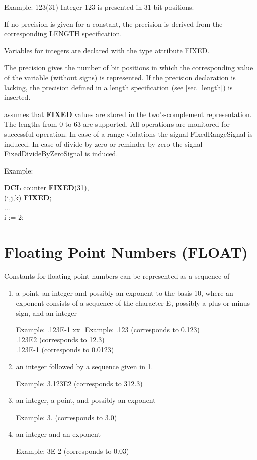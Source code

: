 Example: 123(31) \x Integer 123 is presented in 31 bit positions.

If no precision is given for a constant,
the precision is derived from the %
corresponding LENGTH specification.

Variables for integers are declared with the type attribute FIXED.




The precision gives the number of bit positions in which the
corresponding value of the variable (without signs) is represented. If
the precision declaration is lacking, the precision defined in a length
specification (see \ref{sec_length}) is inserted. 

\OpenPEARL{} assumes that {\bf FIXED} values are stored in the two's-complement
representation.  The lengths from 0 to 63 are supported.
All operations are monitored for successful operation.
In case of a range violations the signal FixedRangeSignal is induced.
In case of divide by zero or reminder by zero the signal FixedDivideByZeroSignal
is induced.

Example:

{\bf DCL} counter {\bf FIXED}(31),\\
\x (i,j,k) {\bf FIXED};\\
...\\
i := 2;

\section{Floating Point Numbers (FLOAT)}  %

Constants for floating point numbers can be represented as a sequence of
\begin{enumerate}
\item a point, an integer and possibly an exponent to the basis 10,
where an exponent consists of a sequence of the character E, possibly a
plus or minus sign, and an integer

\begin{tabbing}
Example: \= .123E-1 xx \=  \kill
Example: \> .123 \> (corresponds to 0.123)\\
 \> .123E2 \> (corresponds to 12.3)\\
 \> .123E-1 \> (corresponds to 0.0123)
\end{tabbing}

\item an integer followed by a sequence given in 1.

Example: 3.123E2 (corresponds to 312.3)

\item an integer, a point, and possibly an exponent

Example: 3. (corresponds to 3.0)

\item an integer and an exponent

Example: 3E-2 (corresponds to 0.03)
\end{enumerate}

